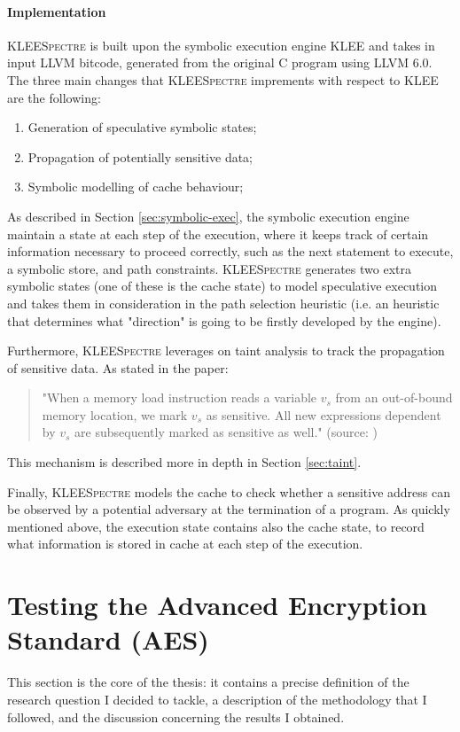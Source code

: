 \documentclass[12pt,a4paper]{book}
\theoremstyle{definition}
\begin{document}
	\paragraph{Implementation} \textsc{KLEESpectre} is built upon the symbolic execution engine KLEE \cite{Cadar2008} and takes in input LLVM bitcode, generated from the original C program using LLVM 6.0. The three main changes that \textsc{KLEESpectre} imprements with respect to KLEE are the following:
	\begin{enumerate}
		\item Generation of speculative symbolic states;
		\item Propagation of potentially sensitive data;
		\item Symbolic modelling of cache behaviour;
	\end{enumerate}
	As described in Section \ref{sec:symbolic-exec}, the symbolic execution engine maintain a state at each step of the execution, where it keeps track of certain information necessary to proceed correctly, such as the next statement to execute, a symbolic store, and path constraints. \textsc{KLEESpectre} generates two extra symbolic states (one of these is the cache state) to model speculative execution and takes them in consideration in the path selection heuristic (i.e. an heuristic that determines what "direction" is going to be firstly developed by the engine).
	
	Furthermore, \textsc{KLEESpectre} leverages on taint analysis to track the propagation of sensitive data. As stated in the paper:
	\begin{quote}
		"When a memory load instruction reads a variable $v_s$ from an out-of-bound memory location, we mark $v_s$ as sensitive. All new expressions dependent by $v_s$ are subsequently marked as sensitive as well." (source: \cite{Wang2020})
	\end{quote} 
	This mechanism is described more in depth in Section \ref{sec:taint}.
	
	Finally, \textsc{KLEESpectre} models the cache to check whether a sensitive address can be observed by a potential adversary at the termination of a program. As quickly mentioned above, the execution state contains also the cache state, to record what information is stored in cache at each step of the execution.
	
	\section{Testing the Advanced Encryption Standard (AES)}\label{sec:testing}
	This section is the core of the thesis: it contains a precise definition of the research question I decided to tackle, a description of the methodology that I followed, and the discussion concerning the results I obtained.
	
\end{document}
